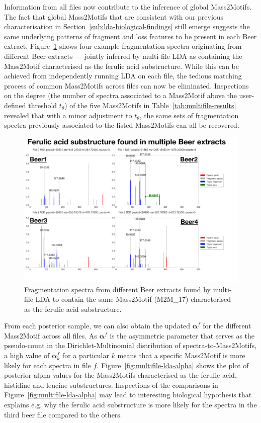 Information from all files now contribute to the inference of global Mass2Motifs. The fact that global Mass2Motifs that are consistent with our previous characterisation in Section~\ref{sub:lda-biological-findings} still emerge suggests the same underlying patterns of fragment and loss features to be present in each Beer extract. Figure~\ref{fig:multifile-lda} shows four example fragmentation spectra originating from different Beer extracts --- jointly inferred by multi-file LDA as containing the Mass2Motif characterised as the ferulic acid substructure. While this can be achieved from independently running LDA on each file, the tedious matching process of common Mass2Motifs across files can now be eliminated. Inspections on the degree (the number of spectra associated to a Mass2Motif above the user-defined threshold $t_{\theta}$) of the five Mass2Motifs in Table~\ref{tab:multifile-results} revealed that with a minor adjustment to $t_{\theta}$, the same sets of fragmentation spectra previously associated to the listed Mass2Motifs can all be recovered. 

\begin{figure}[!htbp]
\centering\includegraphics[width=1.0\linewidth]{07-lda/figures/multifile.pdf}
\centering\caption{Fragmentation spectra from different Beer extracts found by multi-file LDA to contain the same Mass2Motif (M2M_17) characterised as the ferulic acid substructure.\label{fig:multifile-lda}}
\end{figure}

From each posterior sample, we can also obtain the updated $\boldsymbol{\alpha}^f$ for the different Mass2Motif across all files. As $\boldsymbol{\alpha}^f$ is the asymmetric parameter that serves as the pseudo-count in the Dirichlet-Multinomial distribution of spectra-to-Mass2Motifs, a high value of $\boldsymbol{\alpha}^f_k$ for a particular $k$ means that a specific Mass2Motif is more likely for each spectra in file $f$. Figure~\ref{fig:multifile-lda-alpha} shows the plot of posterior alpha values for the Mass2Motifs characterised as the ferulic acid, histidine and leucine substructures. Inspections of the comparisons in Figure~\ref{fig:multifile-lda-alpha} may lead to interesting biological hypothesis that explains e.g. why the ferulic acid substructure is more likely for the spectra in the third beer file compared to the others.

